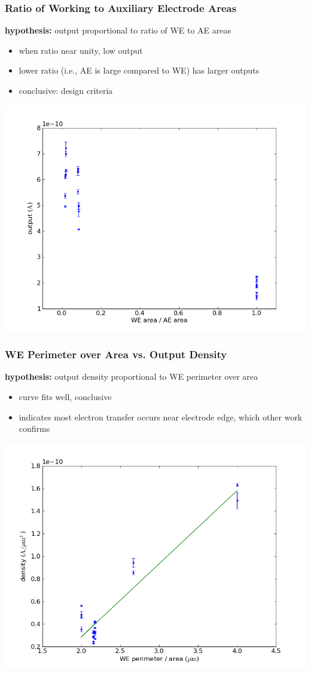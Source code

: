 \documentclass[10pt]{beamer}
\begin{document}
\begin{frame}
	\frametitle{Ratio of Working to Auxiliary Electrode Areas}
	\textbf{hypothesis:} output proportional to ratio of WE to AE areas
	\begin{itemize}
		\item when ratio near unity, low output
		\item lower ratio (i.e., AE is large compared to WE) has larger outputs
		\item conclusive: design criteria
	\end{itemize}
	\includegraphics[width=0.8\linewidth]{figures/area_ratio_v_output.png}
\end{frame}

\begin{frame}
	\frametitle{WE Perimeter over Area vs. Output Density}
	\textbf{hypothesis:} output density proportional to WE perimeter over area
	\begin{itemize}
		\item curve fits well, conclusive
		\item indicates most electron transfer occurs near electrode edge, which other work confirms
	\end{itemize}
	\includegraphics[width=0.8\linewidth]{figures/perim_area_v_density.png}
\end{frame}
\end{document}
